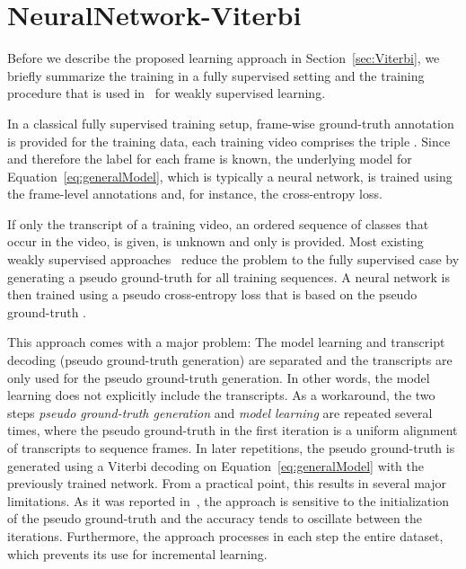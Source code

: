 \documentclass[10pt,twocolumn,letterpaper]{article}
\begin{document}
\section{NeuralNetwork-Viterbi}
\label{sec:end2endViterbi}


Before we describe the proposed learning approach in Section~\ref{sec:Viterbi}, we briefly summarize the training in a fully supervised setting and the training procedure that is used in~\cite{kuehne2017weakly,koller2016deephand,richard2017weakly,koller2017resign} for weakly supervised learning.   
 
In a classical fully supervised training setup, frame-wise ground-truth annotation
is provided for the training data, \ie each training video comprises the triple . 
Since  and therefore the label  for each frame  is known, the underlying model for Equation~\eqref{eq:generalModel}, which is typically a neural network, is trained using the frame-level annotations and, for instance, the cross-entropy loss.



If only the transcript of a training video, \ie an ordered sequence of classes that occur in the video, is given,  is unknown and only  is provided. Most existing weakly supervised approaches~\cite{kuehne2017weakly,koller2016deephand,richard2017weakly,koller2017resign}
reduce the problem to the fully supervised case by generating a pseudo ground-truth 
for all training sequences. A neural network is then trained using a pseudo cross-entropy
loss that is based on the pseudo ground-truth . 

This approach comes with a major problem:
The model learning and transcript decoding (\ie pseudo ground-truth generation) are
separated and the transcripts  are only used for the pseudo ground-truth 
generation. In other words, the model learning does not explicitly include the transcripts.
As a workaround, the two steps \textit{pseudo ground-truth generation} and \textit{model learning}
are repeated several times, where the pseudo ground-truth in the first iteration
is a uniform alignment of transcripts to sequence frames.
In later repetitions, the pseudo ground-truth is generated using a Viterbi decoding on Equation~\eqref{eq:generalModel} with the previously trained network. From a practical point, this results in several major limitations. As it was reported in~\cite{richard2017weakly}, the approach is sensitive to the initialization of the pseudo ground-truth and the accuracy tends to oscillate between the iterations. Furthermore, the approach processes in each step the entire dataset, which prevents its use for incremental learning.              
\end{document}
